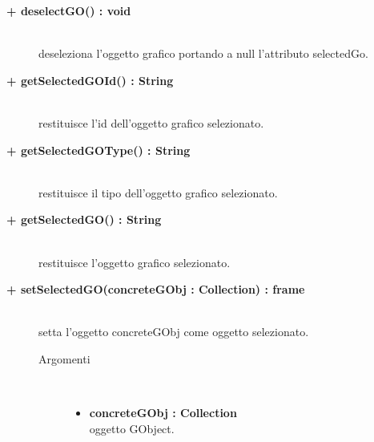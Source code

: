\begin{description}
\begin{description}
\end{description}

\begin{description}
		\item[\textbf{\color{blue}+ deselectGO() : void			}] \hfill \\
			deseleziona l'oggetto grafico portando a null l'attributo selectedGo. 
\end{description}

\begin{description}
		\item[\textbf{\color{blue}+ getSelectedGOId() : String			}] \hfill \\
			restituisce l'id dell'oggetto grafico selezionato.
\end{description}

\begin{description}
		\item[\textbf{\color{blue}+ getSelectedGOType() : String			}] \hfill \\
			restituisce il tipo dell'oggetto grafico selezionato.
\end{description}

\begin{description}
		\item[\textbf{\color{blue}+ getSelectedGO() : String			}] \hfill \\
			restituisce l'oggetto grafico selezionato.
\end{description}

\begin{description}
		\item[\textbf{\color{blue}+ setSelectedGO(concreteGObj : Collection) : frame			}] \hfill \\
			setta l'oggetto concreteGObj come oggetto selezionato.  

\begin{description}
			\item[Argomenti] \hfill \\
				\begin{itemize}
						\item \textbf{concreteGObj : Collection			} \hfill \\
					oggetto GObject.
				\end{itemize}

\end{description}

\end{description}


\end{description}
